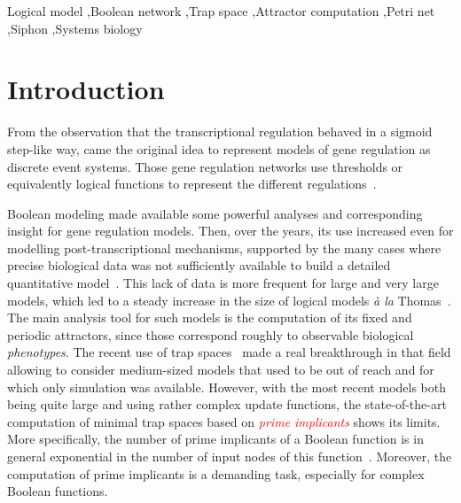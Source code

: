 \documentclass[preprint,12pt]{elsarticle}
\newcommand{\change}[1]{\textcolor{red}{#1}}
\begin{document}
\begin{frontmatter}
\begin{abstract}
\end{abstract}


\begin{keyword}
Logical model \sep Boolean network \sep Trap space \sep Attractor computation \sep Petri net \sep Siphon \sep Systems biology
\end{keyword}

\end{frontmatter}

\linenumbers%

\section{Introduction}

From the observation that the transcriptional regulation behaved in a sigmoid step-like way, came the original idea to represent models of gene regulation as discrete event systems.
Those gene regulation networks use thresholds or equivalently logical functions to represent the different regulations~\cite{glass1973logical,thomas1973boolean,thomas1990biological,thomas1991regulatory}.

Boolean modeling made available some powerful analyses and corresponding insight for gene regulation models.
Then, over the years, its use increased even for modelling post-transcriptional mechanisms, supported by the many cases where precise biological data was not sufficiently available to build a detailed quantitative model~\cite{wang2012boolean}.
This lack of data is more frequent for large and very large models, which led to a steady increase in the size of logical models \emph{à la} Thomas~\cite{aghamiri2020automated}.
The main analysis tool for such models is the computation of its fixed and periodic attractors, since those correspond roughly to observable biological \emph{phenotypes}.
The recent use of trap spaces~\cite{klarner2015computing} made a real breakthrough in that field allowing to consider medium-sized models that used to be out of reach and for which only simulation was available.
However, with the most recent models both being quite large and using rather complex update functions, the state-of-the-art computation of minimal trap spaces based on \emph{\change{prime implicants}} shows its limits.
More specifically, the number of prime implicants of a Boolean function is in general exponential in the number of input nodes of this function~\cite{klarner2015computing}.
Moreover, the computation of prime implicants is a demanding task, especially for complex Boolean functions.
\end{document}
